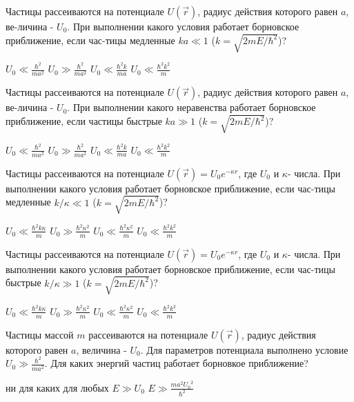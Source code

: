\documentclass[11pt,a4paper]{exam}
\begin{document}
\begin{questions}
\question Частицы рассеиваются на потенциале $U(\vec r)$, радиус действия которого равен $a$, ве-личина - ${U_0}$. При выполнении какого условия работает борновское приближение, если час-тицы медленные $ka \ll 1$ ($k = \sqrt {2mE/{\hbar ^2}} $)?
\begin{choices}
\choice ${U_0} \ll \frac{{{\hbar ^2}}}{{m{a^2}}}$    
\choice ${U_0} \gg \frac{{{\hbar ^2}}}{{m{a^2}}}$    
\choice ${U_0} \ll \frac{{{\hbar ^2}k}}{{ma}}$    
\choice ${U_0} \ll \frac{{{\hbar ^2}{k^2}}}{m}$
\end{choices}

\question Частицы рассеиваются на потенциале $U(\vec r)$, радиус действия которого равен $a$, ве-личина - ${U_0}$. При выполнении какого неравенства работает борновское приближение, если частицы быстрые $ka \gg 1$ ($k = \sqrt {2mE/{\hbar ^2}} $)?
\begin{choices}
\choice ${U_0} \ll \frac{{{\hbar ^2}}}{{m{a^2}}}$    
\choice ${U_0} \gg \frac{{{\hbar ^2}}}{{m{a^2}}}$    
\choice ${U_0} \ll \frac{{{\hbar ^2}k}}{{ma}}$    
\choice ${U_0} \ll \frac{{{\hbar ^2}{k^2}}}{m}$
\end{choices}

\question Частицы рассеиваются на потенциале $U(\vec r) = {U_0}{e^{ - \kappa r}}$, где ${U_0}$ и $\kappa $- числа. При выполнении какого условия работает борновское приближение, если час-тицы медленные $k/\kappa  \ll 1$ ($k = \sqrt {2mE/{\hbar ^2}} $)?
\begin{choices}
\choice ${U_0} \ll \frac{{{\hbar ^2}k\kappa }}{m}$   
\choice ${U_0} \gg \frac{{{\hbar ^2}{\kappa ^2}}}{m}$      
\choice ${U_0} \ll \frac{{{\hbar ^2}{\kappa ^2}}}{m}$      
\choice ${U_0} \ll \frac{{{\hbar ^2}{k^2}}}{m}$
\end{choices}

\question Частицы рассеиваются на потенциале $U(\vec r) = {U_0}{e^{ - \kappa r}}$, где ${U_0}$ и $\kappa $- числа. При выполнении какого условия работает борновское приближение, если час-тицы быстрые $k/\kappa  \gg 1$ ($k = \sqrt {2mE/{\hbar ^2}} $)?
\begin{choices}
\choice  ${U_0} \ll \frac{{{\hbar ^2}k\kappa }}{m}$  
\choice ${U_0} \gg \frac{{{\hbar ^2}{\kappa ^2}}}{m}$      
\choice ${U_0} \ll \frac{{{\hbar ^2}{\kappa ^2}}}{m}$      
\choice ${U_0} \ll \frac{{{\hbar ^2}{k^2}}}{m}$
\end{choices}

\question Частицы массой $m$ рассеиваются на потенциале $U(\vec r)$, радиус действия которого равен $a$, величина - ${U_0}$. Для параметров потенциала выполнено условие ${U_0} \gg \frac{{{\hbar ^2}}}{{m{a^2}}}$. Для каких энергий частиц работает борновкое приближение?
\begin{choices}
\choice ни для каких   
\choice для любых      
\choice $E \gg {U_0}$     
\choice $E \gg \frac{{m{a^2}{U_0}^2}}{{{\hbar ^2}}}$
\end{choices}


\end{questions}
\end{document}
